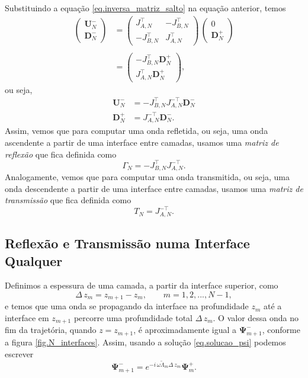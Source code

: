 Substituindo a equa\c{c}\~ao \ref{eq.inversa_matriz_salto} na equa\c{c}\~ao anterior, temos
\begin{align*}
\begin{pmatrix}
\mathbf{U}_N^-\\
\mathbf{D}_N^-
\end{pmatrix}
&=
\begin{pmatrix}
J_{A,N}^\top&-J_{B,N}^\top\\
-J_{B,N}^\top&J_{A,N}^\top
\end{pmatrix}
\,
\begin{pmatrix}
0\\
\mathbf{D}_N^+
\end{pmatrix}\\\\
&=
\begin{pmatrix}
-J_{B,N}^\top \mathbf{D}_N^+\\
 J_{A,N}^\top \mathbf{D}_N^+
\end{pmatrix},
\end{align*}
ou seja,
\begin{align*}
\mathbf{U}_N^-&=-J_{B,N}^\top J_{A,N}^{-\top}\mathbf{D}_N^-\\
\mathbf{D}_N^+&=J_{A,N}^{-\top}\mathbf{D}_N^-.
\end{align*}
Assim, vemos que para computar uma onda refletida, ou seja, uma onda ascendente a partir de uma interface entre camadas, usamos uma \textit{matriz de reflex\~ao} que fica definida como
\begin{equation}\label{eq.reflexao_N}
\Gamma_N=-J_{B,N}^\top J_{A,N}^{-\top}.
\end{equation} 
Analogamente, vemos que para computar uma onda transmitida, ou seja, uma onda descendente a partir de uma interface entre camadas, usamos uma \textit{matriz de transmiss\~ao} que fica definida como
\begin{equation}\label{eq.transmissao_N}
T_N=J_{A,N}^{-\top}.
\end{equation} 

\subsection{Reflex\~ao e Transmiss\~ao numa Interface Qualquer}
Definimos a espessura de uma camada, a partir da interface superior, como
\begin{equation}
\Delta\,z_m=z_{m+1}-z_m,\qquad m=1,2,...,N-1,
\end{equation}
e temos que uma onda se propagando da interface na profundidade $z_m$ at\'e a interface em $z_{m+1}$ percorre uma profundidade total $\Delta\,z_m$. O valor dessa onda no fim da trajet\'oria, quando $z=z_{m+1}$, \'e aproximadamente igual a $\mathbf{\Psi}^-_{m+1}$, conforme a figura \ref{fig.N_interfaces}. Assim, usando a solu\c{c}\~ao \ref{eq.solucao_psi} podemos escrever
\begin{equation}\label{eq.solucao_delta_zm}
\mathbf{\Psi}^-_{m+1}=e^{-i\,\omega\tilde{\Lambda}_m\Delta\,z_m}\mathbf{\Psi}^+_m.
\end{equation}

